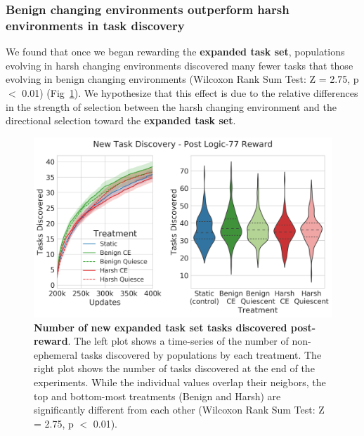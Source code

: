 \documentclass[10pt,letterpaper,final]{article}
\begin{document}
\subsubsection*{Benign changing environments outperform harsh environments in task discovery}
We found that once we began rewarding the \textbf{expanded task set}, populations evolving in harsh changing environments discovered many fewer tasks that those evolving in benign changing environments (Wilcoxon Rank Sum Test: Z = 2.75, p $<$ 0.01) (Fig~\ref{fig:postreward_task_discovery}). We hypothesize that this effect is due to the relative differences in the strength of selection between the harsh changing environment and the directional selection toward the \textbf{expanded task set}. 
	\begin{figure}[!h]
	\includegraphics[width=0.95\columnwidth]{figures/LTE/lte-simple-post_reward_task_discovery.png}
	\caption{\textbf{Number of new expanded task set tasks discovered post-reward}. The left plot shows a time-series of the number of non-ephemeral tasks discovered by populations by each treatment. The right plot shows the number of tasks discovered at the end of the experiments. While the individual values overlap their neigbors, the top and bottom-most treatments (Benign and Harsh) are significantly different from each other (Wilcoxon Rank Sum Test: Z = 2.75, p $<$ 0.01). %
	}
	\label{fig:postreward_task_discovery}
	\end{figure} 
\end{document}
